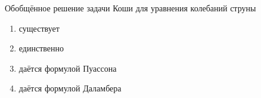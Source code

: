 Обобщённое решение задачи Коши для уравнения колебаний струны

\begin{enumerate}[label=\arabic*)]
    \item существует
    \item единственно
    \item даётся формулой Пуассона
    \item даётся формулой Даламбера
\end{enumerate}

